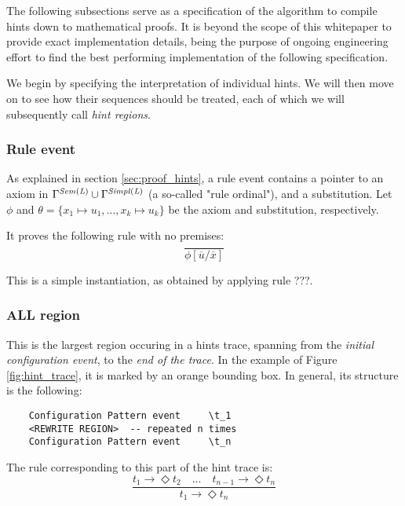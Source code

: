 \documentclass{article}
\theoremstyle{plain}
\theoremstyle{definition}
\begin{document}
The following subsections serve as a specification of the algorithm to compile hints down to mathematical proofs. It is beyond the scope of this whitepaper to provide exact implementation details, being the purpose of ongoing engineering effort to find the best performing implementation of the following specification.

We begin by specifying the interpretation of individual hints. We will then move on to see how their sequences should be treated, each of which we will subsequently call \textit{hint regions}.

\subsubsection*{Rule event}
As explained in section \ref{sec:proof_hints}, a rule event contains a pointer to an axiom in $\Gamma^{\it Sem(L)} \cup \Gamma^{\it Simpl(L)}$ (a so-called "rule ordinal"), and a substitution. Let $\phi$ and $\theta = \{x_1\mapsto u_1,\ldots,x_k\mapsto u_k\}$ be the axiom and substitution, respectively.

It proves the following rule with no premises:
\[
\dfrac{}{\phi[\overline{u}/\overline{x}]}
\tag{RULE EVENT}\label{rule:rule_event}
\]

This is a simple instantiation, as obtained by applying rule ???.

\subsubsection*{ALL region}


This is the largest region occuring in a hints trace, spanning from the \textit{initial configuration event}, to the \textit{end of the trace}. In the example of Figure \ref{fig:hint_trace}, it is marked by an orange bounding box. In general, its structure is the following:

\begin{verbatim}
    Configuration Pattern event     \t_1
    <REWRITE REGION>  -- repeated n times
    Configuration Pattern event     \t_n
\end{verbatim}

The rule corresponding to this part of the hint trace is:
\[
\dfrac{t_1 \rightarrow{} \Diamond t_2 \quad ... \quad t_{n-1} \rightarrow \Diamond t_n}{t_1 \rightarrow{} \Diamond t_n}
\tag{ALL}\label{rule:all}
\]
\end{document}
